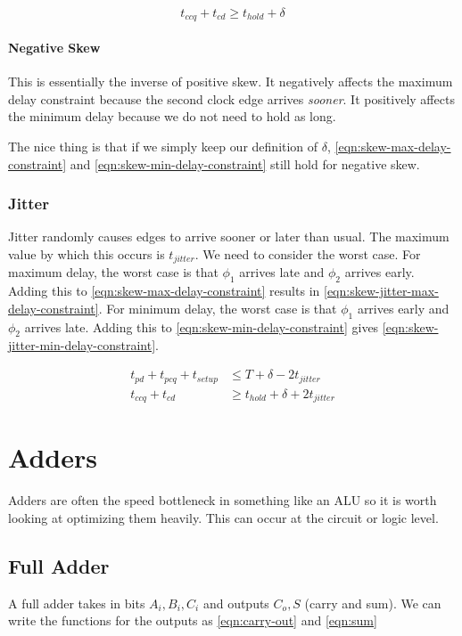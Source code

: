 \documentclass[11pt]{report}
\begin{document}
\begin{equation}
	\label{eqn:skew-min-delay-constraint}
	t_{ccq} + t_{cd} \ge t_{hold} + \delta
\end{equation}

\subsubsection{Negative Skew}
This is essentially the inverse of positive skew. It negatively affects the maximum delay constraint because the second clock edge arrives \textit{sooner}. It positively affects the minimum delay because we do not need to hold as long.

The nice thing is that if we simply keep our definition of $\delta$, \autoref{eqn:skew-max-delay-constraint} and \autoref{eqn:skew-min-delay-constraint} still hold for negative skew.

\subsection{Jitter}

Jitter randomly causes edges to arrive sooner or later than usual. The maximum value by which this occurs is $t_{jitter}$. We need to consider the worst case. For maximum delay, the worst case is that $\phi_1$ arrives late and $\phi_2$ arrives early. Adding this to \autoref{eqn:skew-max-delay-constraint} results in \autoref{eqn:skew-jitter-max-delay-constraint}. For minimum delay, the worst case is that $\phi_1$ arrives early and $\phi_2$ arrives late. Adding this to \autoref{eqn:skew-min-delay-constraint} gives \autoref{eqn:skew-jitter-min-delay-constraint}.


\begin{align}
	\label{eqn:skew-jitter-max-delay-constraint}
	t_{pd}+t_{pcq}+t_{setup} &\le T + \delta - 2t_{jitter}\\
	\label{eqn:skew-jitter-min-delay-constraint}
	t_{ccq}+t_{cd} &\ge t_{hold} + \delta + 2t_{jitter}
\end{align}


\chapter{Adders}
Adders are often the speed bottleneck in something like an ALU so it is worth looking at optimizing them heavily. This can occur at the circuit or logic level.

\section{Full Adder}
A full adder takes in bits $A_i, B_i, C_i$ and outputs $C_o, S$ (carry and sum). We can write the functions for the outputs as \autoref{eqn:carry-out} and \autoref{eqn:sum}
\end{document}
